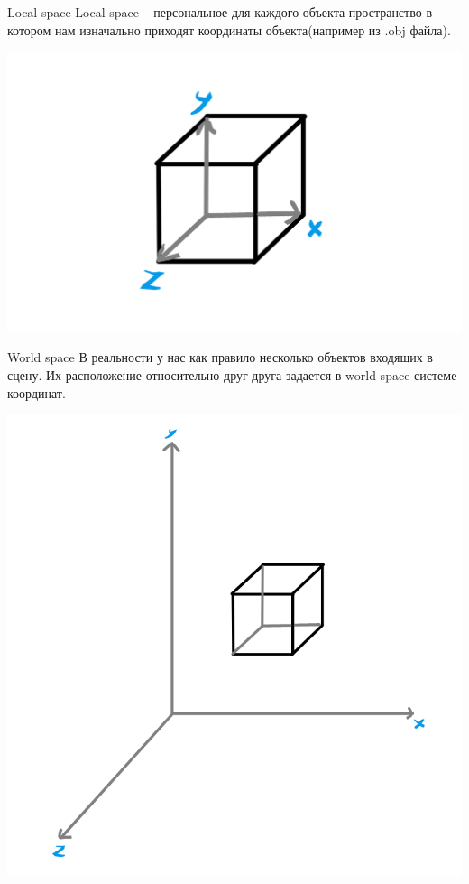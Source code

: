 \documentclass{beamer}
\begin{document}
\begin{frame}{Local space}
    Local space -- персональное для каждого объекта пространство в котором нам изначально приходят 
    координаты объекта(например из .obj файла). 
\begin{center}
\includegraphics[width=0.86 \linewidth]{local.png}
\end{center}
\end{frame}
\begin{frame}{World space}
    В реальности у нас как правило несколько объектов входящих в 
    сцену. Их расположение относительно друг друга задается в world space 
    системе координат.
\begin{center}
\includegraphics[width=0.5 \linewidth]{world.png}
\end{center}
\end{frame}
\end{document}
